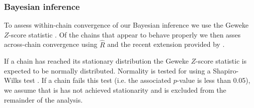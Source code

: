 \documentclass{bioinfo}
\begin{document}
\subsubsection{Bayesian inference}





To assess within-chain convergence of our Bayesian inference we use the Geweke $Z$-score statistic \citep{geweke1991evaluating}. Of the chains that appear to behave properly we then asses across-chain convergence using $\hat{R}$ \citep{gelman1992inference} and the recent extension provided by \cite{vats2018revisiting}. 

If a chain has reached its stationary distribution the Geweke $Z$-score statistic is expected to be normally distributed. Normality is tested for using a Shapiro-Wilks test \citep{shapiro1965analysis}. If a chain fails this test (i.e. the associated $p$-value is less than 0.05), we assume that is has not achieved stationarity and is excluded from the remainder of the analysis.
\end{document}
